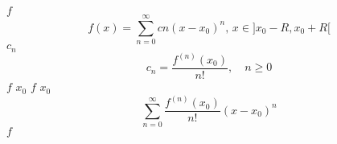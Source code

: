 \documentclass{article}
\begin{document}
$f$
$$
f(x) = \sum_{n=0}^{\infty}{cn(x-x_0)^n}
\text{, } x \in ]x_0 - R, x_0 + R[
$$
$c_n$
$$
c_n = \frac{f^{(n)}(x_0)}{n!}, \quad n \geq 0
$$
$f$
$x_0$
$f$
$x_0$
$$
\sum_{n=0}^{\infty}{\frac{f^{(n)}(x_0)}{n!}}(x-x_0)^n
$$
$f$
\end{document}
